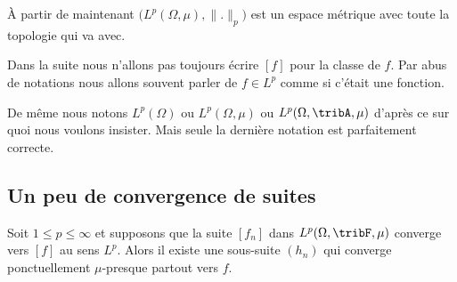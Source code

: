 \begin{normaltext}
    À partir de maintenant \( \big( L^p(\Omega,\mu),\| . \|_p \big)\) est un espace métrique avec toute la topologie qui va avec.

    Dans la suite nous n'allons pas toujours écrire \( [f]\) pour la classe de \( f\). Par abus de notations nous allons souvent parler de \( f\in L^p\) comme si c'était une fonction.

    De même nous notons \( L^p(\Omega)\) ou \( L^p(\Omega,\mu)\) ou \( L^p(\Omega,\tribA,\mu)\) d'après ce sur quoi nous voulons insister. Mais seule la dernière notation est parfaitement correcte.
\end{normaltext}

\subsection{Un peu de convergence de suites}

\begin{proposition}  \label{PropWoywYG}
    Soit \( 1\leq p\leq \infty\) et supposons que la suite \( [f_n]\) dans \( L^p(\Omega,\tribF,\mu)\) converge vers \( [f]\) au sens \( L^p\). Alors il existe une sous-suite \( (h_n)\) qui converge ponctuellement \( \mu\)-presque partout vers \( f\).
\end{proposition}

